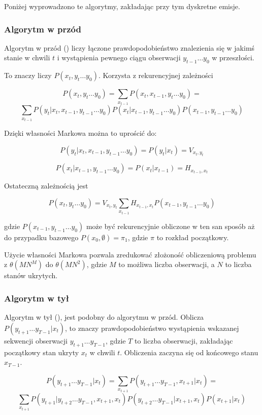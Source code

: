 Poniżej wyprowadzono te algorytmy, zakładając przy tym dyskretne emisje.

\subsubsection{Algorytm w przód}

Algorytm w przód () liczy łączone prawdopodobieństwo znalezienia się w jakimś stanie w chwili $t$
i wystąpienia pewnego ciągu obserwacji $y_{t-1} \dots y_0$ w przeszłości. 

To znaczy liczy $P(x_t, y_t \dots y_0)$. Korzysta z rekurencyjnej zależności

$$P(x_t, y_t \dots y_0) = \sum_{x_{t-1}} P(x_t, x_{t-1}, y_t \dots y_0) =$$
$$\sum_{x_{t-1}} P(y_t | x_t, x_{t-1}, y_{t-1} \dots y_0) P(x_t | x_{t-1}, y_{t-1} \dots y_0) P(x_{t-1}, y_{t-1} \dots y_0)$$

Dzięki własności Markowa można to uprościć do:

$$P(y_t | x_t, x_{t-1}, y_{t-1} \dots y_0) = P(y_t | x_t) = V_{x_t, y_t}$$  

$$P(x_t | x_{t-1}, y_{t-1} \dots y_0) = P(x_t | x_{t-1}) = H_{x_{t-1}, x_t}$$

Ostateczną zależnością jest

$$P(x_t, y_t \dots y_0) = V_{x_t, y_t} \sum_{x_{t-1}} H_{x_{t-1}, x_t} P(x_{t-1}, y_{t-1} \dots y_0) $$

gdzie $P(x_{t-1}, y_{t-1} \dots y_0)$ może być rekurencyjnie obliczone w ten san sposób aż do przypadku bazowego $P(x_0, \emptyset) = \pi_1$, gdzie $\pi$ to rozkład początkowy.

Użycie własności Markowa pozwala zredukować złożoność obliczeniową problemu z $\theta(MN^M)$ do $\theta(MN^2)$, gdzie $M$ to możliwa liczba obserwacji, a $N$ to liczba stanów ukrytych.

\subsubsection{Algorytm w tył}

Algorytm w tył (), jest podobny do algorytmu w przód. Oblicza $P(y_{t+1} \dots y_{T-1} | x_t)$, to znaczy prawdopodobieństwo wystąpienia wskazanej sekwencji obserwacji $y_{t+1} \dots y_{T-1}$, gdzie $T$ to liczba obserwacji, zakładając początkowy stan ukryty $x_t$ w chwili $t$. Obliczenia zaczyna się od końcowego stanu $x_{T-1}$.

$$P(y_{t+1} \dots y_{T-1} | x_t) = \sum_{x_{t+1}} P(y_{t+1} \dots y_{T-1}, x_{t+1} | x_t) =$$
$$\sum_{x_{t+1}} P(y_{t+1} | y_{t+2} \dots y_{T-1}, x_{t+1}, x_t) P(y_{t+2} \dots y_{T-1} | x_{t+1}, x_t) P(x_{t+1} | x_t)$$

